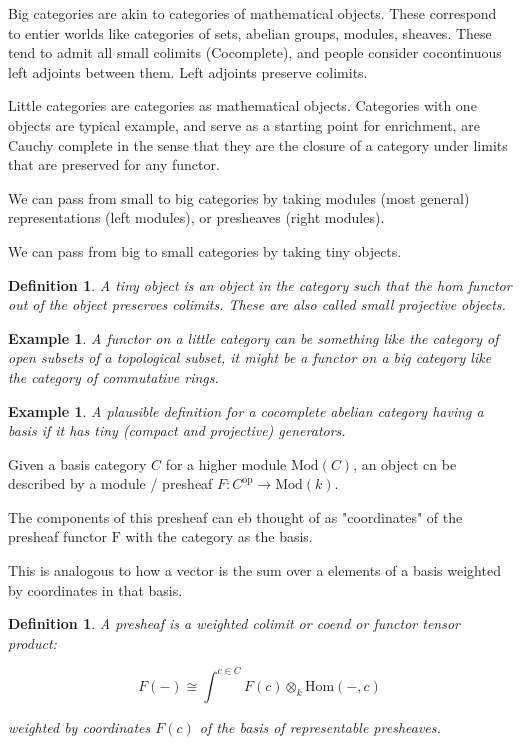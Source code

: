 \documentclass{tufte-book}
\newtheorem{definition}[theorem]{Definition}
\newtheorem{example}[theorem]{Example}
\begin{document}
Big categories are akin to categories of mathematical objects. These correspond to entier worlds like categories of sets, abelian groups, modules, sheaves. These tend to admit all small colimits (Cocomplete), and people consider cocontinuous left adjoints between them. Left adjoints preserve colimits.

Little categories are categories as mathematical objects. Categories with one objects are typical example, and serve as a starting point for enrichment, are Cauchy complete in the sense that they are the closure of a category under limits that are preserved for any functor.

We can pass from small to big categories by taking modules (most general) representations (left modules), or presheaves (right modules). 

We can pass from big to small categories by taking tiny objects.

\begin{definition}
	A tiny object is an object in the category such that the hom functor out of the object preserves colimits. These are also called small projective objects.
\end{definition}

\begin{example}
	A functor on a little category can be something like the category of open subsets of a topological subset, it might be a functor on a big category like the category of commutative rings.
\end{example}

\begin{example}
	A plausible definition for a cocomplete abelian category having a basis if it has tiny (compact and projective) generators.
\end{example}

Given a basis category $C$ for a higher module $\mathrm{Mod}(C)$, an object cn be described by a module / presheaf $F : C^\mathrm{op} \rightarrow \mathrm{Mod}(k)$.

The components of this presheaf can eb thought of as "coordinates" of the presheaf functor $\mathrm{F}$ with the category as the basis.

This is analogous to how a vector is the sum over a elements of a basis weighted by coordinates in that basis.

\begin{definition}
	A presheaf is a weighted colimit or coend or functor tensor product:

	\begin{equation}
		F(-) \cong \int^{c \in C}
		F(c) \otimes_k \mathrm{Hom}(-,c)
	\end{equation}

	weighted by coordinates $F(c)$ of the basis of representable presheaves.
\end{definition}
\end{document}
